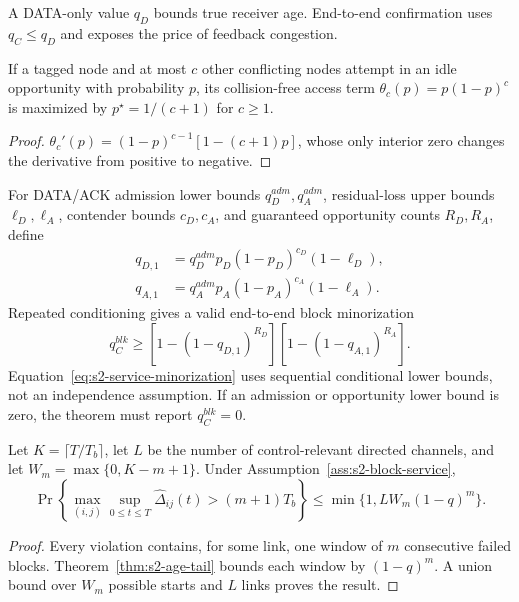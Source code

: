A DATA-only value $q_D$ bounds true receiver age.  End-to-end confirmation
uses $q_C\le q_D$ and exposes the price of feedback congestion.

\begin{proposition}
If a tagged node and at most $c$ other conflicting nodes attempt in an idle
opportunity with probability $p$, its collision-free access term
$\theta_c(p)=p(1-p)^c$ is maximized by
$p^\star=1/(c+1)$ for $c\ge1$.
\label{prop:s2-p-optimum}
\end{proposition}

\begin{proof}
$\theta_c'(p)=(1-p)^{c-1}[1-(c+1)p]$, whose only interior zero changes the
derivative from positive to negative.
\end{proof}

For DATA/ACK admission lower bounds $q_D^{adm},q_A^{adm}$, residual-loss upper
bounds $\ell_D,\ell_A$, contender bounds $c_D,c_A$, and guaranteed opportunity
counts $R_D,R_A$, define
\begin{align}
q_{D,1}&=q_D^{adm}p_D(1-p_D)^{c_D}(1-\ell_D),\\
q_{A,1}&=q_A^{adm}p_A(1-p_A)^{c_A}(1-\ell_A).
\end{align}
Repeated conditioning gives a valid end-to-end block minorization
\begin{equation}
q_C^{blk}\ge
[1-(1-q_{D,1})^{R_D}]
[1-(1-q_{A,1})^{R_A}].
\label{eq:s2-service-minorization}
\end{equation}
Equation~\eqref{eq:s2-service-minorization} uses sequential conditional lower
bounds, not an independence assumption.  If an admission or opportunity lower
bound is zero, the theorem must report $q_C^{blk}=0$.

\begin{theorem}
Let $K=\lceil T/T_b\rceil$, let $L$ be the number of control-relevant directed
channels, and let $W_m=\max\{0,K-m+1\}$.  Under
Assumption~\ref{ass:s2-block-service},
\begin{equation}
\Pr\!\left\{
\max_{(i,j)}\sup_{0\le t\le T}\widehat\Delta_{ij}(t)
>(m+1)T_b\right\}
\le\min\{1,LW_m(1-q)^m\}.
\label{eq:s2-uniform-age}
\end{equation}
\label{thm:s2-uniform-age}
\end{theorem}

\begin{proof}
Every violation contains, for some link, one window of $m$ consecutive failed
blocks.  Theorem~\ref{thm:s2-age-tail} bounds each window by $(1-q)^m$.
A union bound over $W_m$ possible starts and $L$ links proves the result.
\end{proof}

